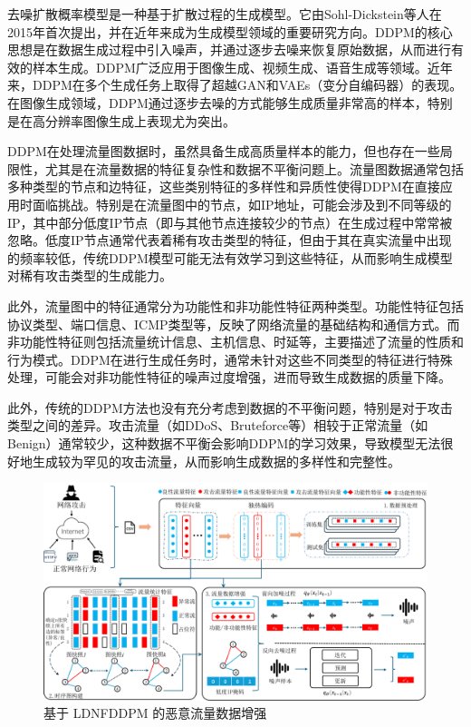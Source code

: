 \documentclass[promaster]{thesis-uestc}
\begin{document}
去噪扩散概率模型是一种基于扩散过程的生成模型。它由Sohl-Dickstein等人在2015年首次提出，并在近年来成为生成模型领域的重要研究方向。DDPM的核心思想是在数据生成过程中引入噪声，并通过逐步去噪来恢复原始数据，从而进行有效的样本生成。DDPM广泛应用于图像生成、视频生成、语音生成等领域。近年来，DDPM在多个生成任务上取得了超越GAN和VAEs（变分自编码器）的表现。在图像生成领域，DDPM通过逐步去噪的方式能够生成质量非常高的样本，特别是在高分辨率图像生成上表现尤为突出。

DDPM在处理流量图数据时，虽然具备生成高质量样本的能力，但也存在一些局限性，尤其是在流量数据的特征复杂性和数据不平衡问题上。流量图数据通常包括多种类型的节点和边特征，这些类别特征的多样性和异质性使得DDPM在直接应用时面临挑战。特别是在流量图中的节点，如IP地址，可能会涉及到不同等级的IP，其中部分低度IP节点（即与其他节点连接较少的节点）在生成过程中常常被忽略。低度IP节点通常代表着稀有攻击类型的特征，但由于其在真实流量中出现的频率较低，传统DDPM模型可能无法有效学习到这些特征，从而影响生成模型对稀有攻击类型的生成能力。

此外，流量图中的特征通常分为功能性和非功能性特征两种类型。功能性特征包括协议类型、端口信息、ICMP类型等，反映了网络流量的基础结构和通信方式。而非功能性特征则包括流量统计信息、主机信息、时延等，主要描述了流量的性质和行为模式。DDPM在进行生成任务时，通常未针对这些不同类型的特征进行特殊处理，可能会对非功能性特征的噪声过度增强，进而导致生成数据的质量下降。

此外，传统的DDPM方法也没有充分考虑到数据的不平衡问题，特别是对于攻击类型之间的差异。攻击流量（如DDoS、Bruteforce等）相较于正常流量（如Benign）通常较少，这种数据不平衡会影响DDPM的学习效果，导致模型无法很好地生成较为罕见的攻击流量，从而影响生成数据的多样性和完整性。
\begin{figure}[h!]
    \centering
    \includegraphics[width=1\linewidth]{./pic/框架图(大字版).pdf}
    \caption{基于 LDNFDDPM 的恶意流量数据增强}
    \label{frame}
\end{figure}
\end{document}

